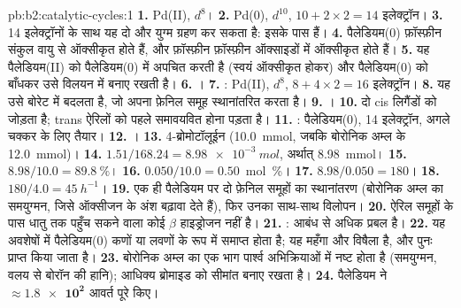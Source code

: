 \begin{solution}{pb:b2:catalytic-cycles:1}
\textbf{1.} Pd(II), $d^8$।
\textbf{2.} Pd(0), $d^{10}$, $10 + 2 \times 2 = 14$ इलेक्ट्रॉन।
\textbf{3.} 14 इलेक्ट्रॉनों के साथ यह दो और युग्म ग्रहण कर सकता है: इसके पास  हैं।
\textbf{4.} पैलेडियम(0) फ़ॉस्फ़ीन संकुल वायु से ऑक्सीकृत होते हैं, और फ़ॉस्फ़ीन
फ़ॉस्फ़ीन ऑक्साइडों में ऑक्सीकृत होते हैं।
\textbf{5.} यह पैलेडियम(II) को पैलेडियम(0) में अपचित करती है (स्वयं ऑक्सीकृत होकर) और
पैलेडियम(0) को बाँधकर उसे विलयन में बनाए रखती है।
\textbf{6.} ।
\textbf{7.} : Pd(II), $d^8$, $8 + 4 \times 2 =
16$ इलेक्ट्रॉन।
\textbf{8.} यह उसे बोरेट  में बदलता है, जो अपना फ़ेनिल समूह स्थानांतरित करता है।
\textbf{9.} ।
\textbf{10.}  दो cis लिगैंडों को जोड़ता है; trans ऐरिलों को पहले समावयवित होना पड़ता है।
\textbf{11.} : पैलेडियम(0), 14 इलेक्ट्रॉन, अगले
चक्कर के लिए तैयार।
\textbf{12.} ।
\textbf{13.} 4-ब्रोमोटॉलूईन (\qty{10.0}{mmol}, जबकि बोरोनिक अम्ल के \qty{12.0}{mmol})।
\textbf{14.} $1.51/168.24 = \qty{8.98e-3}{mol}$, अर्थात् \qty{8.98}{mmol}।
\textbf{15.} $8.98/10.0 = 89.8~\%$।
\textbf{16.} $0.050/10.0 = 0.50$~mol~\%।
\textbf{17.} $8.98/0.050 = 180$।
\textbf{18.} $180/4.0 = \qty{45}{h^{-1}}$।
\textbf{19.} एक ही पैलेडियम पर दो फ़ेनिल समूहों का स्थानांतरण (बोरोनिक अम्ल का
समयुग्मन, जिसे ऑक्सीजन के अंश बढ़ावा देते हैं), फिर उनका साथ-साथ विलोपन।
\textbf{20.} ऐरिल समूहों के पास धातु तक पहुँच सकने वाला कोई $\beta$ हाइड्रोजन नहीं है।
\textbf{21.} :  आबंध  से अधिक प्रबल है।
\textbf{22.} यह अवशेषों में पैलेडियम(0) कणों या लवणों के रूप में समाप्त होता है; यह महँगा और
विषैला है, और पुनः प्राप्त किया जाता है।
\textbf{23.} बोरोनिक अम्ल का एक भाग पार्श्व अभिक्रियाओं में नष्ट होता है (समयुग्मन, वलय से
बोरॉन की हानि); आधिक्य ब्रोमाइड को सीमांत बनाए रखता है।
\textbf{24.} पैलेडियम ने $\boldsymbol{\approx \num{1.8e2}}$ आवर्त पूरे किए।
\end{solution}
